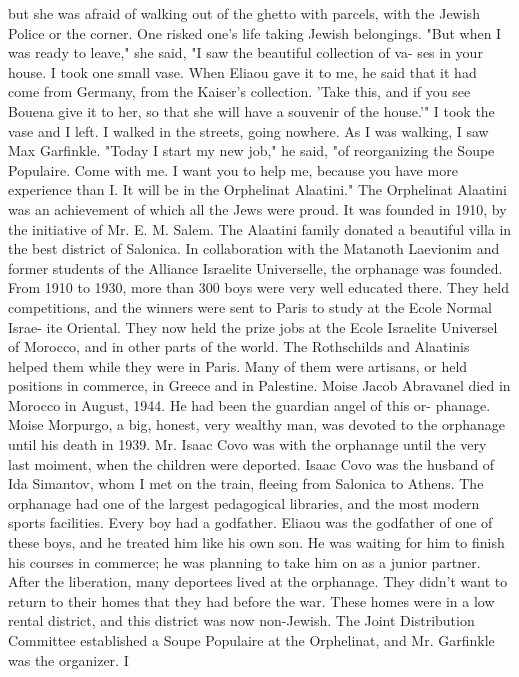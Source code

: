 but she was afraid of walking out of the ghetto with parcels, with the Jewish Police or 
the corner. One risked one's life taking Jewish belongings. 
"But when I was ready to leave," she said, "I saw the beautiful collection of va-
ses in your house. I took one small vase. When Eliaou gave it to me, he said that it 
had come from Germany, from the Kaiser's collection. 'Take this, and if you see Bouena 
give it to her, so that she will have a souvenir of the house.'" 
I took the vase and I left. I walked in the streets, going nowhere. As I was 
walking, I saw Max Garfinkle. 
"Today I start my new job," he said, "of reorganizing the Soupe Populaire. Come 
with me. I want you to help me, because you have more experience than I. It will be 
in the Orphelinat Alaatini." 
The Orphelinat Alaatini was an achievement of which all the Jews were proud. It was 
founded in 1910, by the initiative of Mr. E. M. Salem. The Alaatini family donated a 
beautiful villa in the best district of Salonica. In collaboration with the Matanoth 
Laevionim and former students of the Alliance Israelite Universelle, the orphanage was 
founded. From 1910 to 1930, more than 300 boys were very well educated there. They 
held competitions, and the winners were sent to Paris to study at the Ecole Normal Israe-
ite Oriental. They now held the prize jobs at the Ecole Israelite Universel of Morocco, 
and in other parts of the world. 
The Rothschilds and Alaatinis helped them while they were in Paris. Many of them 
were artisans, or held positions in commerce, in Greece and in Palestine. Moise Jacob 
Abravanel died in Morocco in August, 1944. He had been the guardian angel of this or-
phanage. Moise Morpurgo, a big, honest, very wealthy man, was devoted to the orphanage 
until his death in 1939. Mr. Isaac Covo was with the orphanage until the very last moiment, when the children were deported. Isaac Covo was the husband of Ida Simantov, whom I met on the train, fleeing from Salonica to Athens. 
The orphanage had one of the largest pedagogical libraries, and the most 
modern sports facilities. Every boy had a godfather. Eliaou was the godfather 
of one of these boys, and he treated him like his own son. He was waiting for him to 
finish his courses in commerce; he was planning to take him on as a junior partner. 
After the liberation, many deportees lived at the orphanage. They didn't want to
return to their homes that they had before the war. These homes were in a low rental 
district, and this district was now non-Jewish. The Joint Distribution Committee established a Soupe Populaire at the Orphelinat, and Mr. Garfinkle was the organizer. I 
